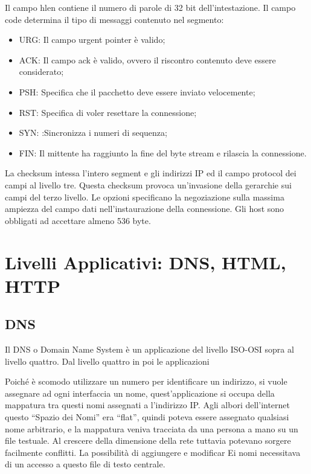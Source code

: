 \documentclass{article}
\numberwithin{equation}{subsection}
\begin{document}
Il campo hlen contiene il numero di parole di 32 bit dell'intestazione. Il campo code determina il tipo di messaggi contenuto nel segmento:
\begin{itemize}
    \item URG: Il campo urgent pointer è valido;
    \item ACK: Il campo ack è valido, ovvero il riscontro contenuto deve essere considerato;
    \item PSH: Specifica che il pacchetto deve essere inviato velocemente;
    \item RST: Specifica di voler resettare la connessione;
    \item SYN: :Sincronizza i numeri di sequenza;
    \item FIN: Il mittente ha raggiunto la fine del byte stream e rilascia la connessione. 
\end{itemize}

La checksum intessa l'intero segment e gli indirizzi IP ed il campo protocol dei campi al livello tre. Questa checksum provoca un'invasione della gerarchie sui campi del 
terzo livello. Le opzioni specificano la negoziazione sulla massima ampiezza del campo dati nell'instaurazione della connessione. Gli host sono obbligati ad accettare 
almeno 536 byte. 


\clearpage

\section{Livelli Applicativi: DNS, HTML, HTTP}

\subsection{DNS}

Il DNS o Domain Name System è un applicazione del livello ISO-OSI sopra al livello quattro. Dal livello quattro in poi le applicazioni 


Poiché è scomodo utilizzare un numero per identificare un indirizzo, si vuole assegnare ad ogni interfaccia un nome, quest'applicazione si occupa della mappatura 
tra questi nomi assegnati a l'indirizzo IP. 
Agli albori dell'internet questo ``Spazio dei Nomi'' era ``flat'', quindi poteva essere assegnato qualsiasi nome arbitrario, e la mappatura veniva tracciata da una 
persona a mano su un file testuale. Al crescere della dimensione della rete tuttavia potevano sorgere facilmente conflitti. La possibilità di aggiungere e modificar Ei nomi 
necessitava di un accesso a questo file di testo centrale. 
\end{document}
